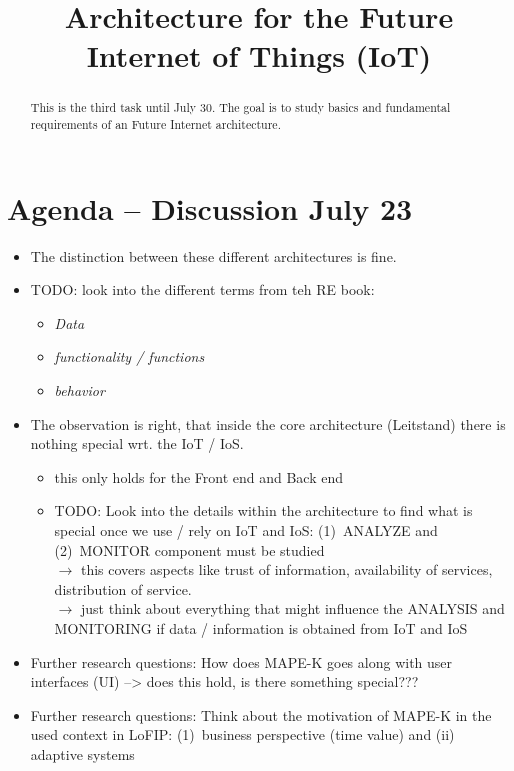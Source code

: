 \documentclass{llncs} %
\begin{document}
\title{Architecture for the Future Internet of Things (IoT)}
 

\maketitle

\begin{abstract}
This is the third  task until July 30.
The goal is to study basics and fundamental requirements of
an Future Internet architecture.
\end{abstract}


\section{Agenda -- Discussion July 23}

\begin{itemize}
	\item The distinction between these different architectures is fine.
   \item TODO: look into the different terms from teh RE book:
	       \begin{itemize}
					 \item \emph{Data}
					 \item \emph{functionality / functions}
					  \item \emph{behavior}
				 \end{itemize}
	\item The observation is right, that inside the core architecture (Leitstand) there 
	is nothing special wrt. the IoT / IoS.
	    \begin{itemize}
				\item this only holds for the Front end and Back end
				\item TODO: Look into the details within the architecture to find what is special
				         once we use / rely on IoT and IoS:
								(1)~ANALYZE and (2)~MONITOR component must be studied \\
								$\rightarrow$ this covers aspects like trust of information,
								 availability of services, distribution of service. \\
								$\rightarrow$ just think about everything that might
								   influence the ANALYSIS and MONITORING if data / information is obtained from
									  IoT and IoS
			\end{itemize}
  \item Further research questions:
	     How does MAPE-K goes along with user interfaces (UI) --> does this hold, is there something special???
	\item Further research questions:
	      Think about the motivation of MAPE-K in the used context in LoFIP:
				   (1)~business perspective (time value) and (ii) adaptive systems 
\end{itemize}
\end{document}
